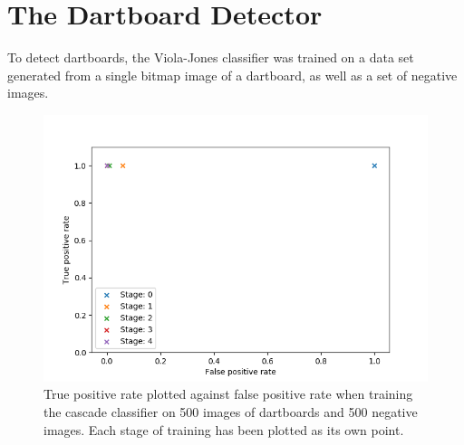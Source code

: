 \documentclass[conference]{IEEEtran}
\begin{document}
\section{The Dartboard Detector}
To detect dartboards, the Viola-Jones classifier was trained on a data set generated from a single bitmap image of a dartboard, as well as a set of negative images. 
\begin{figure}[htbp]
\begin{center}
\includegraphics[width=\linewidth]{images/TPRvsFPR}
\caption{True positive rate plotted against false positive rate when training the cascade classifier on 500 images of dartboards and 500 negative images. Each stage of training has been plotted as its own point.}
\label{default}
\end{center}
\end{figure}
\par
\end{document}
